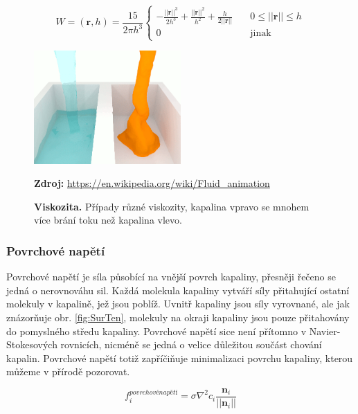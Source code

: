 \begin{equation}
    W = (\mathbf{r}, h) = \frac{15}{2 \pi h^3} 
    \begin{cases}
      -\frac{||\mathbf{r}||^3}{2h^3} + \frac{||\mathbf{r}||^2}{h^2} + \frac{h}{2||\mathbf{r}||} & \quad 0 \leq ||\mathbf{r}|| \leq h \\
      0 & \quad \text{jinak}
    \end{cases}
    \label{eq:pressureKernel}
\end{equation}

\begin{figure}[hbt]
	\centering
	\captionsetup{justification=centering}
	\includegraphics[width=0.5\textwidth]{obrazky-figures/viskozita.PNG}
	\caption{\textbf{Viskozita.} Případy různé viskozity, kapalina vpravo se mnohem více brání toku než kapalina vlevo.}
	\textbf{Zdroj: } \url{https://en.wikipedia.org/wiki/Fluid_animation}
	\label{fig:Vics}
\end{figure}

\subsubsection{Povrchové napětí}
Povrchové napětí je síla působící na vnější povrch kapaliny, přesněji řečeno se jedná o nerovnováhu sil. Každá molekula kapaliny vytváří síly přitahující ostatní molekuly v kapalině, jež jsou poblíž. Uvnitř kapaliny jsou síly vyrovnané, ale jak znázorňuje obr. \ref{fig:SurTen}, molekuly na okraji kapaliny jsou pouze přitahovány do pomyslného středu kapaliny. Povrchové napětí sice není přítomno v Navier-Stokesových rovnicích, nicméně se jedná o velice důležitou součást chování kapalin. Povrchové napětí totiž zapříčiňuje minimalizaci povrchu kapaliny, kterou můžeme v přírodě pozorovat. \cite{KelagerSPH}

\begin{equation}
    f_i^{povrchové napětí} = \sigma \nabla^2 c_i \frac{\mathbf{n}_i}{||\mathbf{n}_i||}
    \label{eq:SurfTen}
\end{equation}

